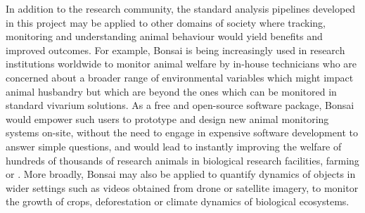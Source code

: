 In addition to the research community, the standard analysis pipelines developed in this project may be applied to other domains of society where tracking, monitoring and understanding animal behaviour would yield benefits and improved outcomes. For example, Bonsai is being increasingly used in research institutions worldwide to monitor animal welfare by in-house technicians who are concerned about a broader range of environmental variables which might impact animal husbandry but which are beyond the ones which can be monitored in standard vivarium solutions. As a free and open-source software package, Bonsai would empower such users to prototype and design new animal monitoring systems on-site, without the need to engage in expensive software development to answer simple questions, and would lead to instantly improving the welfare of hundreds of thousands of research animals in biological research facilities, farming or . More broadly, Bonsai may also be applied to quantify dynamics of objects in wider settings such as videos obtained from drone or satellite imagery, to monitor the growth of crops, deforestation or climate dynamics of biological ecosystems.


